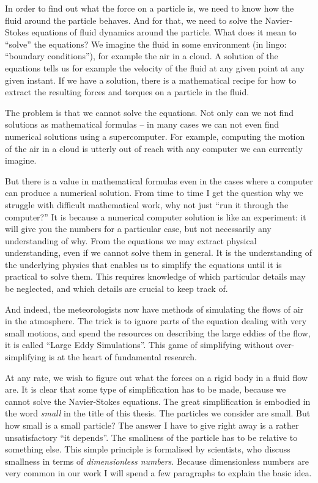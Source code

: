 \documentclass[thesis.tex]{subfiles}
\begin{document}
In order to find out what the force on a particle is, we need to know how the fluid around the particle behaves. And for that, we need to solve the Navier-Stokes equations of fluid dynamics around the particle. What does it mean to ``solve'' the equations? We imagine the fluid in some environment (in lingo: ``boundary conditions''), for example the air in a cloud. A solution of the equations tells us for example the velocity of the fluid at any given point at any given instant. If we have a solution, there is a mathematical recipe for how to extract the resulting forces and torques on a particle in the fluid.

The problem is that we cannot solve the equations. Not only can we not find solutions as mathematical formulas -- in many cases we can not even find numerical solutions using a supercomputer. For example, computing the motion of the air in a cloud is utterly out of reach with any computer we can currently imagine.

But there is a value in mathematical formulas even in the cases where a computer can produce a numerical solution. From time to time I get the question why we struggle with difficult mathematical work, why not just ``run it through the computer?'' It is because a numerical computer solution is like an experiment: it will give you the numbers for a particular case, but not necessarily any understanding of why. From the equations we may extract physical understanding, even if we cannot solve them in general. It is the understanding of the underlying physics that enables us to simplify the equations until it is practical to solve them. This requires knowledge of which particular details may be neglected, and which details are crucial to keep track of. 

And indeed, the meteorologists now have methods of simulating the flows of air in the atmosphere. The trick is to ignore parts of the equation dealing with very small motions, and spend the resources on describing the large eddies of the flow, it is called ``Large Eddy Simulations''. This game of simplifying without over-simplifying is at the heart of fundamental research.

At any rate, we wish to figure out what the forces on a rigid body in a fluid flow are. It is clear that some type of simplification has to be made, because we cannot solve the Navier-Stokes equations. The great simplification is embodied in the word \emph{small} in the title of this thesis. The particles we consider are small. But how small is a small particle? The answer I have to give right away is a rather unsatisfactory ``it depends''. The smallness of the particle has to be relative to something else. This simple principle is formalised by scientists, who discuss smallness in terms of \emph{dimensionless numbers}. Because dimensionless numbers are very common in our work I will spend a few paragraphs to explain the basic idea.
\end{document}
